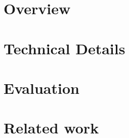 \documentclass[sigplan,screen]{acmart}
\begin{document}
\section{Overview}

\section{Technical Details}

\section{Evaluation}

\section{Related work}





\end{document}
